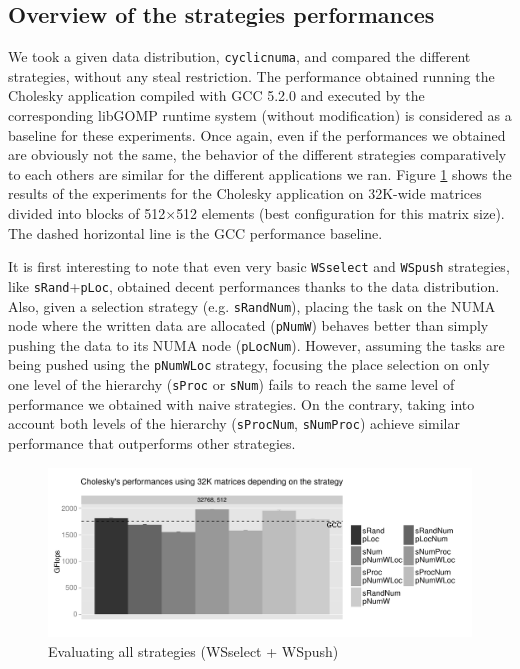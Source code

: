 \documentclass{Styles/llncs}
\begin{document}


\subsection{Overview of the strategies performances}

We took a given data distribution, \verb/cyclicnuma/, and compared the different strategies, without any steal restriction.
The performance obtained running the Cholesky application compiled with GCC 5.2.0 and executed by the corresponding libGOMP runtime system (without modification) is considered as a baseline for these experiments.
Once again, even if the performances we obtained are obviously not the same, the behavior of the different strategies comparatively to each others are similar for the different applications we ran.
Figure \ref{fig:eval-all-strat} shows the results of the experiments for the
Cholesky application on 32K-wide matrices divided into blocks of 512$\times$512 elements (best configuration for this matrix size).
The dashed horizontal line is the GCC performance baseline.

It is first interesting to note that even very basic \verb/WSselect/
and \verb/WSpush/ strategies, like \verb/sRand/+\verb/pLoc/, obtained decent performances
thanks to the data distribution.
Also, given a selection strategy (e.g. \verb/sRandNum/), placing
the task on the NUMA node where the written data are allocated (\verb/pNumW/) behaves better than simply pushing the data to its NUMA node (\verb/pLocNum/).
However, assuming the tasks are being pushed using the \verb/pNumWLoc/ strategy, focusing the
place selection on only one level of the hierarchy (\verb/sProc/ or \verb/sNum/)
fails to reach the same level of performance we obtained with naive strategies.
On the contrary, taking into account both levels of the hierarchy (\verb/sProcNum/,
\verb/sNumProc/) achieve similar performance that outperforms other strategies.

\begin{figure}[t]
  \centering
  \includegraphics[scale=0.5]{figures/graph_all_strat.pdf}
  \caption{Evaluating all strategies (WSselect + WSpush)}
\label{fig:eval-all-strat}
\end{figure}
\end{document}
